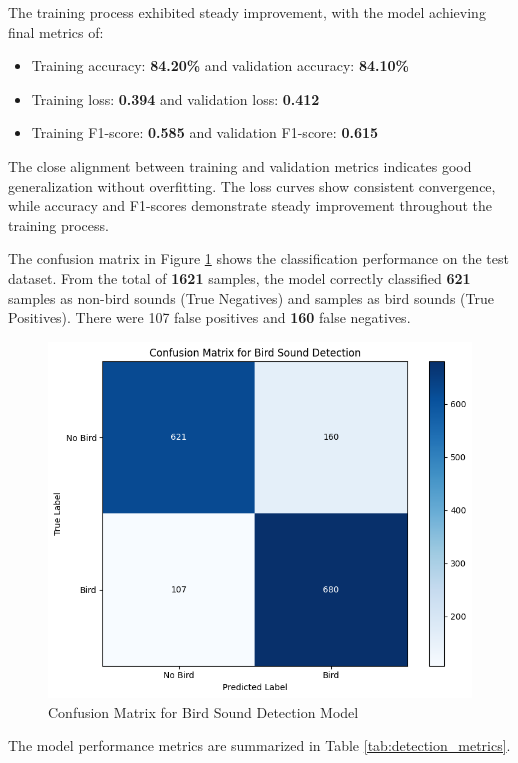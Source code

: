 The training process exhibited steady improvement, with the model achieving final metrics of:
\begin{itemize}
      \item Training accuracy: \textbf{84.20\%} and validation accuracy: \textbf{84.10\%}
            \item Training loss: \textbf{0.394} and validation loss: \textbf{0.412}
            \item Training F1-score: \textbf{0.585} and validation F1-score: \textbf{0.615}
      \end{itemize}

The close alignment between training and validation metrics indicates good generalization without overfitting. The loss curves show consistent convergence, while accuracy and F1-scores demonstrate steady improvement throughout the training process.

The confusion matrix in Figure \ref{fig:Confusion Matrix for Detection Model} shows the classification performance on the test dataset. From the total of \textbf{1621} samples, the model correctly classified \textbf{621} samples as non-bird sounds (True Negatives) and  samples as bird sounds (True Positives). There were 107 false positives and \textbf{160} false negatives.
\begin{figure}[h!]
      \centering
      \includegraphics[scale=0.75]{images/detection_cm.png}
      \caption{Confusion Matrix for Bird Sound Detection Model}
      \label{fig:Confusion Matrix for Detection Model}
\end{figure}
The model performance metrics are summarized in Table \ref{tab:detection_metrics}.


